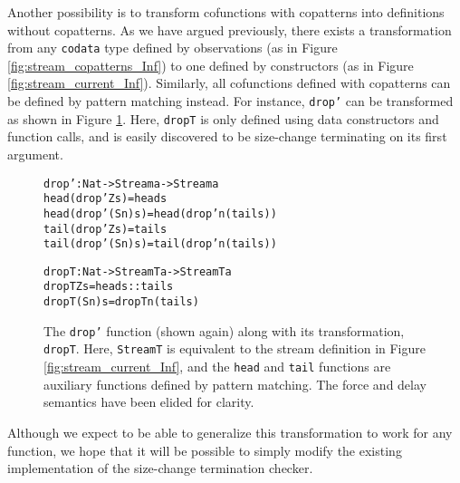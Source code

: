 Another possibility is to transform cofunctions with copatterns into definitions without copatterns. As we have argued previously, there exists a transformation from any \texttt{codata} type defined by observations (as in Figure \ref{fig:stream_copatterns_Inf}) to one defined by constructors (as in Figure \ref{fig:stream_current_Inf}). Similarly, all cofunctions defined with copatterns can be defined by pattern matching instead. For instance, \texttt{drop'} can be transformed as shown in Figure \ref{fig:drop'_dropT}. Here, \texttt{dropT} is only defined using data constructors and function calls, and is easily discovered to be size-change terminating on its first argument. 

\begin{figure}
\begin{alltt}
drop' : Nat -> Stream a -> Stream a
head (drop' Z     s) = head s
head (drop' (S n) s) = head (drop' n (tail s))
tail (drop' Z     s) = tail s
tail (drop' (S n) s) = tail (drop' n (tail s))

dropT : Nat -> StreamT a -> StreamT a
dropT Z     s = head s :: tail s
dropT (S n) s = dropT n (tail s)
\end{alltt}
\caption{The \texttt{drop'} function (shown again) along with its transformation, \texttt{dropT}. Here, \texttt{StreamT} is equivalent to the stream definition in Figure \ref{fig:stream_current_Inf}, and the \texttt{head} and \texttt{tail} functions are auxiliary functions defined by pattern matching. The force and delay semantics have been elided for clarity.}
\label{fig:drop'_dropT}
\end{figure}

Although we expect to be able to generalize this transformation to work for any function, we hope that it will be possible to simply modify the existing implementation of the size-change termination checker.

